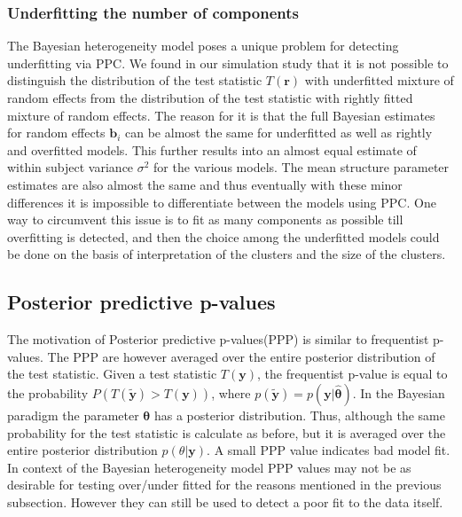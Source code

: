 \subsubsection{Underfitting the number of components}
The Bayesian heterogeneity model poses a unique problem for detecting underfitting via PPC. We found in our simulation study that it is not possible to distinguish the distribution of the test statistic $T(\boldsymbol{r})$ with underfitted mixture of random effects from the distribution of the test statistic with rightly fitted mixture of random effects. The reason for it is that the full Bayesian estimates for random effects $\boldsymbol{b}_i$ can be almost the same for underfitted as well as rightly and overfitted models. This further results into an almost equal estimate of within subject variance $\sigma^2$ for the various models. The mean structure parameter estimates are also almost the same and thus eventually with these minor differences it is impossible to differentiate between the models using PPC. One way to circumvent this issue is to fit as many components as possible till overfitting is detected, and then the choice among the underfitted models could be done on the basis of interpretation of the clusters and the size of the clusters.
 
\subsection{Posterior predictive p-values}
The motivation of Posterior predictive p-values(PPP) is similar to frequentist p-values. The PPP are however averaged over the entire posterior distribution of the test statistic. Given a test statistic $T(\boldsymbol{y})$, the frequentist p-value is equal to the probability $P(T(\boldsymbol{\tilde{y}}) > T(\boldsymbol{y}))$, where $p(\boldsymbol{\tilde{y}}) = p(\boldsymbol{y}|\boldsymbol{\hat{\theta}})$. In the Bayesian paradigm the parameter $\boldsymbol{\theta}$ has a posterior distribution. Thus, although the same probability for the test statistic is calculate as before, but it is averaged over the entire posterior distribution $p(\theta|\boldsymbol{y})$. A small PPP value indicates bad model fit. In context of the Bayesian heterogeneity model PPP values may not be as desirable for testing over/under fitted for the reasons mentioned in the previous subsection. However they can still be used to detect a poor fit to the data itself.

